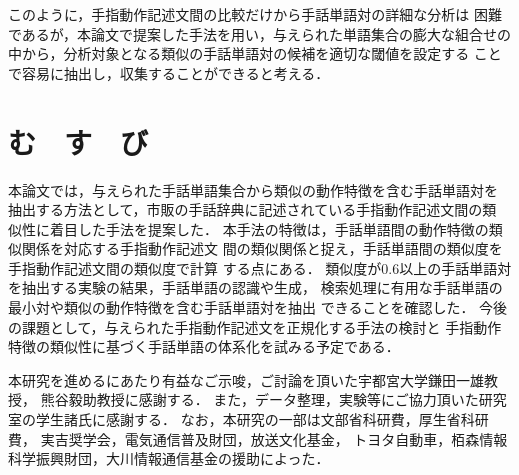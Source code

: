 このように，手指動作記述文間の比較だけから手話単語対の詳細な分析は
困難であるが，本論文で提案した手法を用い，与えられた単語集合の膨大な組合せの
中から，分析対象となる類似の手話単語対の候補を適切な閾値を設定する
ことで容易に抽出し，収集することができると考える．

\section {む　す　び}

本論文では，与えられた手話単語集合から類似の動作特徴を含む手話単語対を
抽出する方法として，市販の手話辞典に記述されている手指動作記述文間の類
似性に着目した手法を提案した．
本手法の特徴は，手話単語間の動作特徴の類似関係を対応する手指動作記述文
間の類似関係と捉え，手話単語間の類似度を手指動作記述文間の類似度で計算
する点にある．
類似度が0.6以上の手話単語対を抽出する実験の結果，手話単語の認識や生成，
検索処理に有用な手話単語の最小対や類似の動作特徴を含む手話単語対を抽出
できることを確認した．
今後の課題として，与えられた手指動作記述文を正規化する手法の検討と
手指動作特徴の類似性に基づく手話単語の体系化を試みる予定である．

\acknowledgment

本研究を進めるにあたり有益なご示唆，ご討論を頂いた宇都宮大学鎌田一雄教授，
熊谷毅助教授に感謝する．
また，データ整理，実験等にご協力頂いた研究室の学生諸氏に感謝する．
なお，本研究の一部は文部省科研費，厚生省科研費，
実吉奨学会，電気通信普及財団，放送文化基金，
トヨタ自動車，栢森情報科学振興財団，大川情報通信基金の援助によった．





\begin{biography}


\end{biography}
\newpage
\

